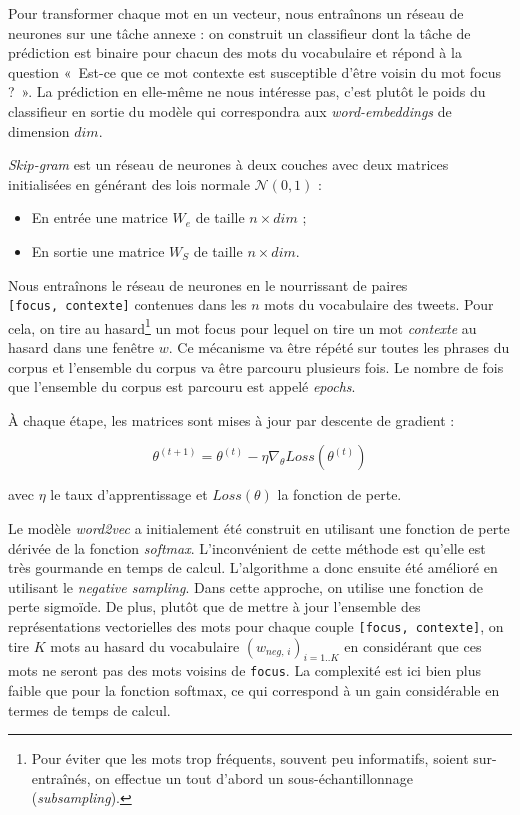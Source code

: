 \documentclass[10pt,french,french]{article}
\let\rmarkdownfootnote\footnote%
\def\footnote{\protect\rmarkdownfootnote}
\begin{document}
Pour transformer chaque mot en un vecteur, nous entraînons un réseau de
neurones sur une tâche annexe : on construit un classifieur dont la
tâche de prédiction est binaire pour chacun des mots du vocabulaire et
répond à la question «~Est-ce que ce mot contexte est susceptible d'être
voisin du mot focus ?~». La prédiction en elle-même ne nous intéresse
pas, c'est plutôt le poids du classifieur en sortie du modèle qui
correspondra aux \emph{word-embeddings} de dimension \(dim\).

\emph{Skip-gram} est un réseau de neurones à deux couches avec deux
matrices initialisées en générant des lois normale \(\mathcal N(0,1)\) :

\begin{itemize}
\item
  En entrée une matrice \(W_e\) de taille \(n\times dim\) ;
\item
  En sortie une matrice \(W_S\) de taille \(n\times dim\).
\end{itemize}

Nous entraînons le réseau de neurones en le nourrissant de paires
\texttt{{[}focus,\ contexte{]}} contenues dans les \(n\) mots du
vocabulaire des tweets. Pour cela, on tire au hasard\footnote{Pour
  éviter que les mots trop fréquents, souvent peu informatifs, soient
  sur-entraînés, on effectue un tout d'abord un sous-échantillonnage
  (\emph{subsampling}).} un mot focus pour lequel on tire un mot
\emph{contexte} au hasard dans une fenêtre \(w\). Ce mécanisme va être
répété sur toutes les phrases du corpus et l'ensemble du corpus va être
parcouru plusieurs fois. Le nombre de fois que l'ensemble du corpus est
parcouru est appelé \emph{epochs}.

À chaque étape, les matrices sont mises à jour par descente de gradient
:

\[\theta^{(t+1)} = \theta^{(t)} - \eta \nabla_\theta Loss(\theta^{(t)})\]

avec \(\eta\) le taux d'apprentissage et \(Loss(\theta)\) la fonction de
perte.

Le modèle \emph{word2vec} a initialement été construit en utilisant une
fonction de perte dérivée de la fonction \emph{softmax}. L'inconvénient
de cette méthode est qu'elle est très gourmande en temps de calcul.
L'algorithme a donc ensuite été amélioré en utilisant le \emph{negative
sampling}. Dans cette approche, on utilise une fonction de perte
sigmoïde. De plus, plutôt que de mettre à jour l'ensemble des
représentations vectorielles des mots pour chaque couple
\texttt{{[}focus,\ contexte{]}}, on tire \(K\) mots au hasard du
vocabulaire \((w_{neg,\,i})_{i=1..K}\) en considérant que ces mots ne
seront pas des mots voisins de \texttt{focus}. La complexité est ici
bien plus faible que pour la fonction softmax, ce qui correspond à un
gain considérable en termes de temps de calcul.
\end{document}
